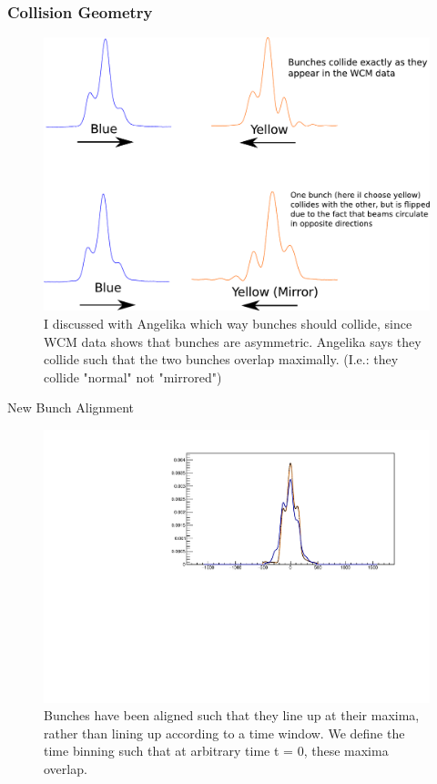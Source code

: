 \begin{frame}
\frametitle{Collision Geometry}
\begin{figure}
\begin{center}
	\includegraphics[width=0.6\linewidth]{../ExploringZProfile/figs/normal_vs_mirrored.pdf}
\end{center}
\caption{ I discussed with Angelika which way bunches should collide, since WCM
data shows that bunches are asymmetric. Angelika says they collide such that the
two bunches overlap maximally. (I.e.: they collide "normal" not "mirrored")}
\label{fig:bunchcollisiondirection}
\end{figure}
\end{frame}

\begin{frame}{New Bunch Alignment}
\begin{figure}
\begin{center}
\includegraphics[width=0.8\linewidth]{../ExploringZProfile/figs/359711_bunch_alignment.pdf}
\end{center}
\caption{Bunches have been aligned such that they line up at their maxima,
rather than lining up according to a time window. We define the time binning such
that at arbitrary time t = 0, these maxima overlap.}
\label{fig:359711_bunch_alignment}
\end{figure}
\end{frame}

